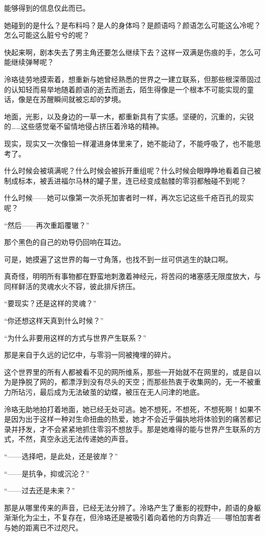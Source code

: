 \documentclass[UTF8, scheme = chinese, openany]{ctexbook}
\begin{document}
能够得到的信息仅此而已。

她碰到的是什么？是布料吗？是人的身体吗？是颜语吗？颜语怎么可能这么冷呢？怎么可能这么脏兮兮的呢？

快起来啊，剧本失去了男主角还要怎么继续下去？这样一双满是伤痕的手，怎么可能继续弹琴呢？

泠珞徒劳地摸索着，想重新与她曾经熟悉的世界之一建立联系，但那些根深蒂固过的认知轻而易举地随着颜语的逝去而逝去，陌生得像是一个根本不可能实现的童话，像是在苏醒瞬间就被忘却的梦境。

地面，光影，以及身边的一草一木，都重新具有了实感。坚硬的，沉重的，尖锐的……这些感觉毫不留情地侵占挤压着泠珞的精神。

现实，现实又一次像铅一样灌进身体里来了，她不能动了，不能呼吸了，也不能思考了。

什么时候会被填满呢？什么时候会被拆开重组呢？什么时候会眼睁睁地看着自己被制成标本，被丢进福尔马林的罐子里，连已经变成骷髅的零羽都触碰不到呢？

什么时候——她可以像第一次杀死加害者时一样，再次忘记这些千疮百孔的现实呢？

“然后——再次重蹈覆辙？”

那个黑色的自己的劝导仍回响在耳边。

可是，她摸遍了这世界的每一寸角落，也找不到一丝可供逃生的缺口啊。

真奇怪，明明所有事物都在野蛮地刺激着神经元，将苦闷的堵塞感无限度放大，与同样鲜活的灵魂水火不容，彼此排斥挤压。

“要现实？还是这样的灵魂？”

“你还想这样天真到什么时候？”

“为什么非要用这样的方式与世界产生联系？”

那是来自于久远的记忆中，与零羽一同被掩埋的碎片。

这个世界里的所有人都被看不见的网所维系，那些一开始就不在网里的，或是自以为是挣脱了网的，都漂浮到没有尽头的天空；而那些热衷于收集网的，无一不被重力所玷污，最后成为无法破茧的幼蝶，被压在无人问津的地底。

泠珞无助地拍打着地面，她已经无处可逃。她不想死，不想死，不想死啊！如果不是因为出于这样一种对生命扭曲的热爱，她才不会近乎偏执地将体验到的痛苦都记录并抒发，才不会紧紧地抓住零羽不想放手。那是她难得的能与世界产生联系的方式，不然，真空永远无法传递她的声音。

“——选择吧，是此处，还是彼岸？”

“——是抗争，抑或沉沦？”

“——过去还是未来？”

那是从哪里传来的声音，已经无法分辨了。泠珞产生了重影的视野中，颜语的身躯渐渐化为尘土，不复存在，但泠珞还是被吸引着向着他的方向靠近——哪怕加害者与她的距离已不过咫尺。
\end{document}
